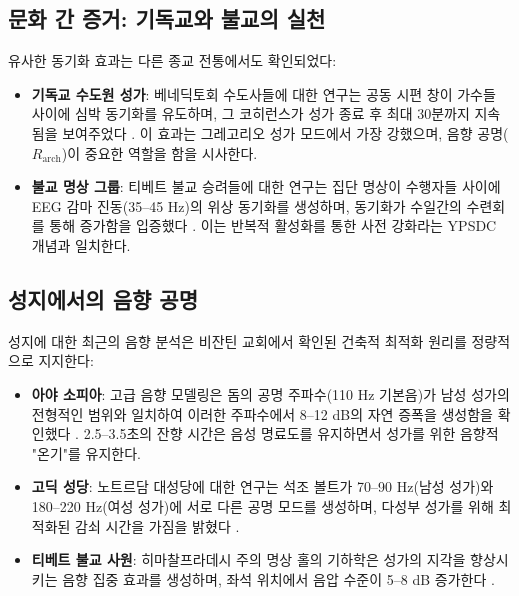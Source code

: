 \documentclass[12pt,a4paper]{article}
\begin{document}
	\subsection{문화 간 증거: 기독교와 불교의 실천}
	
	유사한 동기화 효과는 다른 종교 전통에서도 확인되었다:
	
	\begin{itemize}
		\item \textbf{기독교 수도원 성가}: 베네딕토회 수도사들에 대한 연구는 공동 시편 창이 가수들 사이에 심박 동기화를 유도하며, 그 코히런스가 성가 종료 후 최대 30분까지 지속됨을 보여주었다 \cite{Craswell2023}. 이 효과는 그레고리오 성가 모드에서 가장 강했으며, 음향 공명($R_{\mathrm{arch}}$)이 중요한 역할을 함을 시사한다.
		
		\item \textbf{불교 명상 그룹}: 티베트 불교 승려들에 대한 연구는 집단 명상이 수행자들 사이에 EEG 감마 진동(35–45 Hz)의 위상 동기화를 생성하며, 동기화가 수일간의 수련회를 통해 증가함을 입증했다 \cite{Lutz2017}. 이는 반복적 활성화를 통한 사전 강화라는 YPSDC 개념과 일치한다.
	\end{itemize}
	
	\subsection{성지에서의 음향 공명}
	
	성지에 대한 최근의 음향 분석은 비잔틴 교회에서 확인된 건축적 최적화 원리를 정량적으로 지지한다:
	
	\begin{itemize}
		\item \textbf{아야 소피아}: 고급 음향 모델링은 돔의 공명 주파수(110 Hz 기본음)가 남성 성가의 전형적인 범위와 일치하여 이러한 주파수에서 8–12 dB의 자연 증폭을 생성함을 확인했다 \cite{Pentcheva2020}. 2.5–3.5초의 잔향 시간은 음성 명료도를 유지하면서 성가를 위한 음향적 "온기"를 유지한다.
		
		\item \textbf{고딕 성당}: 노트르담 대성당에 대한 연구는 석조 볼트가 70–90 Hz(남성 성가)와 180–220 Hz(여성 성가)에 서로 다른 공명 모드를 생성하며, 다성부 성가를 위해 최적화된 감쇠 시간을 가짐을 밝혔다 \cite{Suarez2021}.
		
		\item \textbf{티베트 불교 사원}: 히마찰프라데시 주의 명상 홀의 기하학은 성가의 지각을 향상시키는 음향 집중 효과를 생성하며, 좌석 위치에서 음압 수준이 5–8 dB 증가한다 \cite{Dimde2022}.
	\end{itemize}
	
\end{document}
